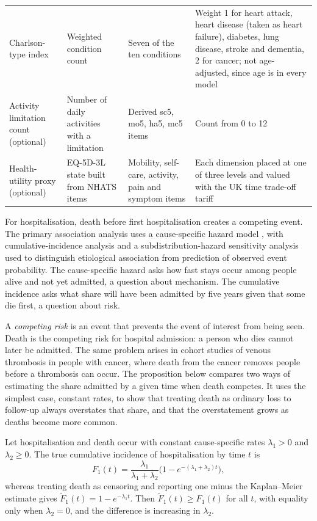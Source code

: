 {\begin{longtable}{>{\raggedright\arraybackslash}p{2.3cm} >{\raggedright\arraybackslash}p{3.8cm} >{\raggedright\arraybackslash}p{3.0cm} >{\raggedright\arraybackslash}p{4.4cm}}
Charlson-type index & Weighted condition count & Seven of the ten conditions & Weight 1 for heart attack, heart disease (taken as heart failure), diabetes, lung disease, stroke and dementia, 2 for cancer; not age-adjusted, since age is in every model \\
Activity limitation count (optional) & Number of daily activities with a limitation & Derived sc5, mo5, ha5, mc5 items & Count from 0 to 12 \\
Health-utility proxy (optional) & EQ-5D-3L state built from NHATS items & Mobility, self-care, activity, pain and symptom items & Each dimension placed at one of three levels and valued with the UK time trade-off tariff \\
\bottomrule
\end{longtable}
}

For hospitalisation, death before first hospitalisation creates a competing event. The primary association analysis uses a cause-specific hazard model \citep{prentice_1978}, with cumulative-incidence analysis and a subdistribution-hazard sensitivity analysis \citep{fine_gray_1999} used to distinguish etiological association from prediction of observed event probability. The cause-specific hazard asks how fast stays occur among people alive and not yet admitted, a question about mechanism. The cumulative incidence asks what share will have been admitted by five years given that some die first, a question about risk.

A \emph{competing risk} is an event that prevents the event of interest from being seen. Death is the competing risk for hospital admission: a person who dies cannot later be admitted. The same problem arises in cohort studies of venous thrombosis in people with cancer, where death from the cancer removes people before a thrombosis can occur. The proposition below compares two ways of estimating the share admitted by a given time when death competes. It uses the simplest case, constant rates, to show that treating death as ordinary loss to follow-up always overstates that share, and that the overstatement grows as deaths become more common.

\begin{proposition}
\label{prop:competing}
Let hospitalisation and death occur with constant cause-specific rates
$\lambda_1>0$ and $\lambda_2\ge0$. The true cumulative incidence of
hospitalisation by time $t$ is
\[
  F_1(t)=\frac{\lambda_1}{\lambda_1+\lambda_2}
         \Big(1-e^{-(\lambda_1+\lambda_2)t}\Big),
\]
whereas treating death as censoring and reporting one minus the Kaplan--Meier
estimate gives $\widetilde F_1(t)=1-e^{-\lambda_1 t}$. Then
$\widetilde F_1(t)\ge F_1(t)$ for all $t$, with equality only when
$\lambda_2=0$, and the difference is increasing in $\lambda_2$.
\end{proposition}

